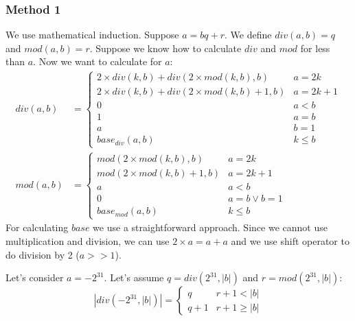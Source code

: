 \documentclass{book}
\begin{document}
	\subsubsection{Method 1}
	We use mathematical induction. Suppose $a = bq + r$. We define $div(a, b) = q$ and $mod(a, b) = r$. Suppose we know how to calculate $div$ and $mod$ for less than $a$. Now we want to calculate for $a$:
	\begin{equation*}
		\begin{split}
		div(a, b) &= \begin{cases}
			2 \times div(k, b) + div(2 \times mod(k, b), b) & a = 2k \\
			2 \times div(k, b) + div(2 \times mod(k, b) + 1 , b) & a = 2k + 1 \\
			0 & a < b \\
			1 & a = b \\
			a & b = 1 \\
			base_{div}(a, b) & k \le b
		\end{cases} \\
		mod(a, b) &= \begin{cases}
			mod(2 \times mod(k, b), b) & a = 2k \\
			mod(2 \times mod(k, b) + 1, b) & a = 2k + 1 \\
			a & a < b \\
			0 & a = b \lor b = 1 \\
			base_{mod}(a, b) & k \le b	
		\end{cases}	
		\end{split}	
	\end{equation*}
	For calculating $base$ we use a straightforward approach. Since we cannot use multiplication and division, we can use $2 \times a = a + a$ and we use shift operator to do division by 2 ($a >> 1$).
	\par Let's consider $a=-2^{31}$. Let's assume $q = div(2^{31}, |b|)$ and $r = mod(2^{31}, |b|)$:
	\begin{equation*}
		|div(-2^{31}, |b|)| = \begin{cases}
			q & r + 1 < |b| \\
			q + 1 & r + 1 \ge |b|
		\end{cases}
	\end{equation*}
\end{document}
